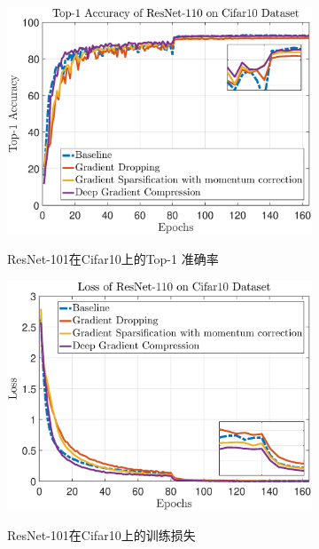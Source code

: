 \begin{figure}[ht]
  \centering
  \label{fig:image_class}
  \begin{subfigure}{7cm}
    \includegraphics[width=\textwidth]{figures/cf_top1.eps}\label{fig:cf1}\caption{ResNet-101在Cifar10上的Top-1 准确率}
  \end{subfigure}
  \begin{subfigure}{7cm}
    \includegraphics[width=\textwidth]{figures/cf_loss.eps}\label{fig:cf2}\\[-2ex]
    \caption{ResNet-101在Cifar10上的训练损失}
  \end{subfigure}
  \begin{subfigure}{7cm}

\end{subfigure}
\end{figure}
